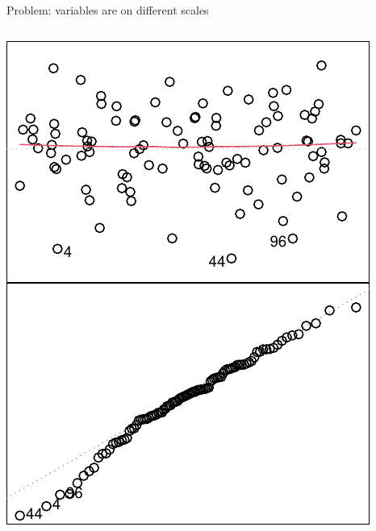 \documentclass[
  ignorenonframetext,
  aspectratio=169]{beamer}
\begin{document}
\begin{frame}[fragile]{Problem: variables are on different scales}
\begin{columns}[T]
\begin{column}{0.48\textwidth}
\includegraphics{03-Lecture_files/figure-beamer/unnamed-chunk-45-1.pdf}
\end{column}
\end{columns}
\end{frame}
\end{document}
